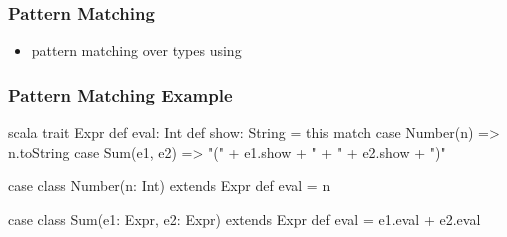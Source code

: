 \documentclass[dvipsnames]{beamer}
\theoremstyle{plain}
\begin{document}
\begin{frame}
  \frametitle{Pattern Matching}

  \begin{itemize}
    \item pattern matching over types using 
  \end{itemize}
\end{frame}

\begin{frame}[fragile]
  \frametitle{Pattern Matching Example}

  \begin{example}[Scala]
    \begin{pygments}{scala}
trait Expr {
    def eval: Int
    def show: String = this match {
        case Number(n) => n.toString
        case Sum(e1, e2) => "(" + e1.show + " + " + e2.show + ")"
    }
}

case class Number(n: Int) extends Expr {
    def eval = n
}

case class Sum(e1: Expr, e2: Expr) extends Expr {
    def eval = e1.eval + e2.eval
}
    \end{pygments}
  \end{example}
\end{frame}

%
%
%
\end{document}
